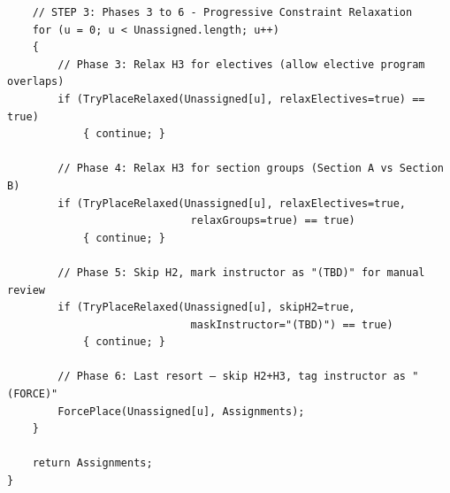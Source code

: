 \documentclass[12pt, a4paper]{article}
\begin{document}
\begin{verbatim}
    // STEP 3: Phases 3 to 6 - Progressive Constraint Relaxation
    for (u = 0; u < Unassigned.length; u++)
    {
        // Phase 3: Relax H3 for electives (allow elective program overlaps)
        if (TryPlaceRelaxed(Unassigned[u], relaxElectives=true) == true)
            { continue; }

        // Phase 4: Relax H3 for section groups (Section A vs Section B)
        if (TryPlaceRelaxed(Unassigned[u], relaxElectives=true,
                             relaxGroups=true) == true)
            { continue; }

        // Phase 5: Skip H2, mark instructor as "(TBD)" for manual review
        if (TryPlaceRelaxed(Unassigned[u], skipH2=true,
                             maskInstructor="(TBD)") == true)
            { continue; }

        // Phase 6: Last resort — skip H2+H3, tag instructor as "(FORCE)"
        ForcePlace(Unassigned[u], Assignments);
    }

    return Assignments;
}
\end{verbatim}
\end{document}
